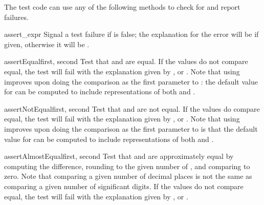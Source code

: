 The test code can use any of the following methods to check for and
report failures.

\begin{methoddesc}[TestCase]{assert_}{expr}
  Signal a test failure if  is false; the explanation for
  the error will be  if given, otherwise it will be
  .
\end{methoddesc}

\begin{methoddesc}[TestCase]{assertEqual}{first, second}
  Test that  and  are equal.  If the values do
  not compare equal, the test will fail with the explanation given by
  , or .  Note that using 
  improves upon doing the comparison as the first parameter to
  :  the default value for  can be
  computed to include representations of both  and
  .
\end{methoddesc}

\begin{methoddesc}[TestCase]{assertNotEqual}{first, second}
  Test that  and  are not equal.  If the values
  do compare equal, the test will fail with the explanation given by
  , or .  Note that using 
  improves upon doing the comparison as the first parameter to
   is that the default value for  can be
  computed to include representations of both  and
  .
\end{methoddesc}

\begin{methoddesc}[TestCase]{assertAlmostEqual}{first, second}
  Test that  and  are approximately equal
  by computing the difference, rounding to the given number of ,
  and comparing to zero.  Note that comparing a given number of decimal places
  is not the same as comparing a given number of significant digits.
  If the values do not compare equal, the test will fail with the explanation
  given by , or .  
\end{methoddesc}

